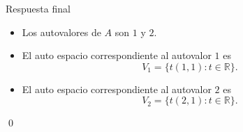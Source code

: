 \documentclass[handout]{beamer} %
\newcommand{\R}{\mathbb R}
\begin{document}


\begin{frame}
    \begin{block}{Respuesta final}
        \begin{itemize}
            \item Los autovalores de $A$ son $1$ y $2$.\pause
            \item El auto espacio correspondiente al  autovalor $1$ es
            \begin{equation*}
                V_1 = \{t(1,1): t \in \R\}.
            \end{equation*}\pause
            \item El auto espacio correspondiente al  autovalor $2$ es
            \begin{equation*}
                V_2 = \{t(2,1): t \in \R\}.
            \end{equation*}
        \end{itemize}
\qed\vskip 2cm
        
    \end{block}
\end{frame}
\end{document}
